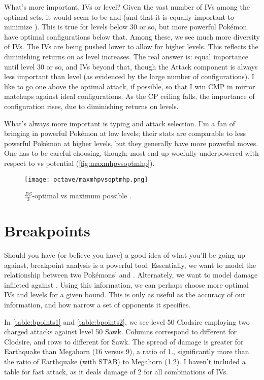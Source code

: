 What's more important, IVs or level?
Given the vast number of  IVs among the optimal sets, it
  would seem to be  and  (and that it is equally
  important to minimize ).
This is true for levels below 30 or so, but more powerful Pokémon
  have optimal configurations below that.
Among these, we see much more diversity of IVs.
The IVs are being pushed lower to allow for higher levels.
This reflects the diminishing returns on \CPM{} as level increases.
The real answer is: equal importance until level 30 or so, and IVs beyond that,
  though the Attack component is always less important than level
  (as evidenced by the large number of  configurations).
I like to go one above the optimal attack, if possible, so that I
  win CMP in mirror matchups against ideal configurations.
As the CP ceiling falls, the importance of configuration rises,
  due to diminishing returns on levels.

What's always more important is typing and attack selection.
I'm a fan of bringing in powerful Pokémon at low levels; their stats are
  comparable to less powerful Pokémon at higher levels, but they
  generally have more powerful moves.
One has to be careful choosing, though; most end up woefully underpowered
  with respect to \MHP{} vs potential \MHP{} (\autoref{fig:maxmhpvsoptmhp}).
\begin{figure}
\texttt{[image: octave/maxmhpvsoptmhp.png]}
  \caption{$\frac{\mathit{BS}}{3}$-optimal \MHP{} vs maximum possible \MHP.\label{fig:maxmhpvsoptmhp}}
\end{figure}


\section{Breakpoints\label{sec:breakpoints}}
Should you have (or believe you have) a good idea of what you'll be going up against,
 breakpoint analysis is a powerful tool.
Essentially, we want to model the relationship between two Pokémons' 
 and .
Alternately, we want to model damage inflicted against \MHP\@.
Using this information, we can perhaps choose more optimal IVs and levels for a given \CP{} bound.
This is only as useful as the accuracy of our information, and how narrow a set of opponents it specifies.

In \autoref{table:bpoints1} and \autoref{table:bpoints2}, we see level 50 Clodsire
  employing two charged attacks against level 50 Sawk.
Columns correspond to different  for Clodsire, and rows to different  for Sawk.
The spread of damage is greater for Earthquake than Megahorn (16 versus 9), a ratio
  of 1., significantly more than the ratio of Earthquake (with STAB)
  to Megahorn (1.2).
I haven't included a table for fast attack, as it deals damage of 2 for all combinations of IVs.

